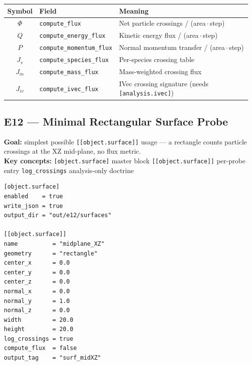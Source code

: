 \documentclass[11pt,a4paper]{article}
\begin{document}
\medskip
\begin{center}\footnotesize
\begin{tabular}{@{}cll@{}}
\toprule
Symbol & Field & Meaning \\
\midrule
$\Phi$   & \texttt{compute\_flux}           & Net particle crossings / (area\,$\cdot$\,step) \\
$Q$      & \texttt{compute\_energy\_flux}   & Kinetic energy flux / (area\,$\cdot$\,step) \\
$P$      & \texttt{compute\_momentum\_flux} & Normal momentum transfer / (area\,$\cdot$\,step) \\
$J_s$    & \texttt{compute\_species\_flux}  & Per-species crossing table \\
$J_m$    & \texttt{compute\_mass\_flux}     & Mass-weighted crossing flux \\
$J_{iv}$ & \texttt{compute\_ivec\_flux}     & IVec crossing signature (needs \texttt{[analysis.ivec]}) \\
\bottomrule
\end{tabular}
\end{center}

\bigskip

\subsection*{E12 --- Minimal Rectangular Surface Probe}

\textbf{Goal:} simplest possible \texttt{[[object.surface]]} usage ---
a rectangle counts particle crossings at the XZ mid-plane, no flux metric.\\
\textbf{Key concepts:} \texttt{[object.surface]} master block \textbullet{}
\texttt{[[object.surface]]} per-probe entry \textbullet{}
\texttt{log\_crossings} \textbullet{} analysis-only doctrine

\begin{tcolorbox}[scriptbox, scriptheader,
  title={scripts/e12\_surface\_probe\_minimal.vsim}]
\begin{lstlisting}[style=vsimlst]
[object.surface]
enabled    = true
write_json = true
output_dir = "out/e12/surfaces"

[[object.surface]]
name          = "midplane_XZ"
geometry      = "rectangle"
center_x      = 0.0
center_y      = 0.0
center_z      = 0.0
normal_x      = 0.0
normal_y      = 1.0
normal_z      = 0.0
width         = 20.0
height        = 20.0
log_crossings = true
compute_flux  = false
output_tag    = "surf_midXZ"
\end{lstlisting}
\end{tcolorbox}
\end{document}
